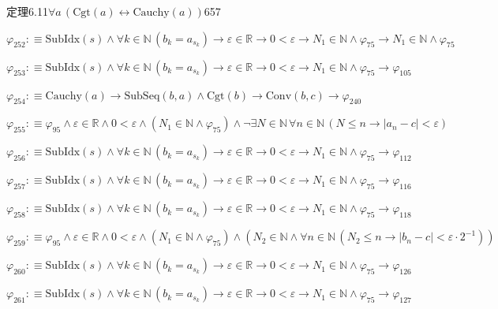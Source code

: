 \begin{fullproof}{定理6.11}{$\forall a\,(\mathrm{Cgt}(a) \leftrightarrow \mathrm{Cauchy}(a))$}{657}
\begin{abbrevlist}
\item $\varphi_{252} :\equiv \mathrm{SubIdx}(s) \land \forall k \in \mathbb{N}\,(b_{k} = a_{s_{k}}) \to \varepsilon \in \mathbb{R} \to 0 < \varepsilon \to N_{1} \in \mathbb{N} \land \varphi_{75} \to N_{1} \in \mathbb{N} \land \varphi_{75}$
\item $\varphi_{253} :\equiv \mathrm{SubIdx}(s) \land \forall k \in \mathbb{N}\,(b_{k} = a_{s_{k}}) \to \varepsilon \in \mathbb{R} \to 0 < \varepsilon \to N_{1} \in \mathbb{N} \land \varphi_{75} \to \varphi_{105}$
\item $\varphi_{254} :\equiv \mathrm{Cauchy}(a) \to \mathrm{SubSeq}(b,a) \land \mathrm{Cgt}(b) \to \mathrm{Conv}(b,c) \to \varphi_{240}$
\item $\varphi_{255} :\equiv \varphi_{95} \land \varepsilon \in \mathbb{R} \land 0 < \varepsilon \land (N_{1} \in \mathbb{N} \land \varphi_{75}) \land \neg \exists N \in \mathbb{N}\,\forall n \in \mathbb{N}\,(N \leq n \to \lvert a_{n} - c \rvert < \varepsilon)$
\item $\varphi_{256} :\equiv \mathrm{SubIdx}(s) \land \forall k \in \mathbb{N}\,(b_{k} = a_{s_{k}}) \to \varepsilon \in \mathbb{R} \to 0 < \varepsilon \to N_{1} \in \mathbb{N} \land \varphi_{75} \to \varphi_{112}$
\item $\varphi_{257} :\equiv \mathrm{SubIdx}(s) \land \forall k \in \mathbb{N}\,(b_{k} = a_{s_{k}}) \to \varepsilon \in \mathbb{R} \to 0 < \varepsilon \to N_{1} \in \mathbb{N} \land \varphi_{75} \to \varphi_{116}$
\item $\varphi_{258} :\equiv \mathrm{SubIdx}(s) \land \forall k \in \mathbb{N}\,(b_{k} = a_{s_{k}}) \to \varepsilon \in \mathbb{R} \to 0 < \varepsilon \to N_{1} \in \mathbb{N} \land \varphi_{75} \to \varphi_{118}$
\item $\varphi_{259} :\equiv \varphi_{95} \land \varepsilon \in \mathbb{R} \land 0 < \varepsilon \land (N_{1} \in \mathbb{N} \land \varphi_{75}) \land (N_{2} \in \mathbb{N} \land \forall n \in \mathbb{N}\,(N_{2} \leq n \to \lvert b_{n} - c \rvert < \varepsilon \cdot 2^{-1}))$
\item $\varphi_{260} :\equiv \mathrm{SubIdx}(s) \land \forall k \in \mathbb{N}\,(b_{k} = a_{s_{k}}) \to \varepsilon \in \mathbb{R} \to 0 < \varepsilon \to N_{1} \in \mathbb{N} \land \varphi_{75} \to \varphi_{126}$
\item $\varphi_{261} :\equiv \mathrm{SubIdx}(s) \land \forall k \in \mathbb{N}\,(b_{k} = a_{s_{k}}) \to \varepsilon \in \mathbb{R} \to 0 < \varepsilon \to N_{1} \in \mathbb{N} \land \varphi_{75} \to \varphi_{127}$

\end{abbrevlist}
\end{fullproof}

